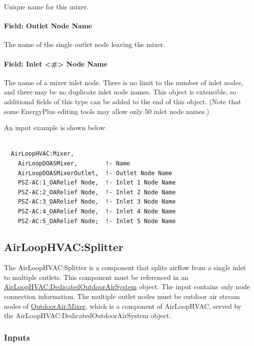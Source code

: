 Unique name for this mixer.

\paragraph{Field: Outlet Node Name}\label{field-outlet-node-name-3}

The name of the single outlet node leaving the mixer.

\paragraph{Field: Inlet \textless{}\#\textgreater{} Node Name}\label{field-inlet-node-name-3}

The name of a mixer inlet node. There is no limit to the number of inlet nodes, and there may be no duplicate inlet node names.  This object is extensible, so additional fields of this type can be added to the end of this object.  (Note that some EnergyPlus editing tools may allow only 50 inlet node names.)

An input example is shown below.

\begin{lstlisting}

  AirLoopHVAC:Mixer,
    AirLoopDOASMixer,        !- Name
    AirLoopDOASMixerOutlet,  !- Outlet Node Name
    PSZ-AC:1_OARelief Node,  !- Inlet 1 Node Name
    PSZ-AC:2_OARelief Node,  !- Inlet 2 Node Name
    PSZ-AC:3_OARelief Node,  !- Inlet 3 Node Name
    PSZ-AC:4_OARelief Node,  !- Inlet 4 Node Name
    PSZ-AC:5_OARelief Node;  !- Inlet 5 Node Name
\end{lstlisting}

\subsection{AirLoopHVAC:Splitter}\label{airloophvacsplitter}

The AirLoopHVAC:Splitter is a component that splits airflow from a single inlet to multiple outlets. This component must be referenced in an \hyperref[airloophvacdedicatedoutdoorairsystem]{AirLoopHVAC:DedicatedOutdoorAirSystem} object. The input contains only node connection information. The multiple outlet nodes must be outdoor air stream nodes of \hyperref[outdoorairmixer]{OutdoorAir:Mixer}, which is a component of AirLoopHVAC, served by the AirLoopHVAC:DedicatedOutdoorAirSystem object.

\subsubsection{Inputs}\label{inputs-4-002}

